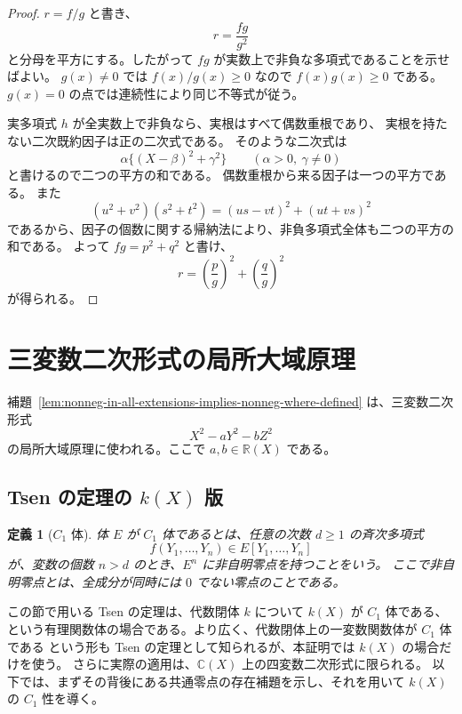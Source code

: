 \documentclass[uplatex,dvipdfmx]{jsarticle}
\newcommand{\Frac}{\mathbb{R}(X)}
\theoremstyle{matrixsosdefinition}
\newtheorem{definition}[theorem]{定義}
\begin{document}
\begin{proof}
  \(r=f/g\) と書き、
  \[
    r=\frac{fg}{g^2}
  \]
  と分母を平方にする。したがって \(fg\) が実数上で非負な多項式であることを示せばよい。
  \(g(x)\ne0\) では \(f(x)/g(x)\ge0\) なので \(f(x)g(x)\ge0\) である。
  \(g(x)=0\) の点では連続性により同じ不等式が従う。

  実多項式 \(h\) が全実数上で非負なら、実根はすべて偶数重根であり、
  実根を持たない二次既約因子は正の二次式である。
  そのような二次式は
  \[
    \alpha\{(X-\beta)^2+\gamma^2\}\qquad(\alpha>0,\ \gamma\ne0)
  \]
  と書けるので二つの平方の和である。
  偶数重根から来る因子は一つの平方である。
  また
  \[
    (u^2+v^2)(s^2+t^2)=(us-vt)^2+(ut+vs)^2
  \]
  であるから、因子の個数に関する帰納法により、非負多項式全体も二つの平方の和である。
  よって \(fg=p^2+q^2\) と書け、
  \[
    r=\left(\frac{p}{g}\right)^2+\left(\frac{q}{g}\right)^2
  \]
  が得られる。
\end{proof}

\section{三変数二次形式の局所大域原理}\label{sec:ternary-local-global}

補題~\ref{lem:nonneg-in-all-extensions-implies-nonneg-where-defined} は、三変数二次形式
\[
  X^2-aY^2-bZ^2
\]
の局所大域原理に使われる。ここで \(a,b\in\Frac\) である。

\subsection{\texorpdfstring{Tsen の定理の \(k(X)\) 版}{Tsen の定理の k(X) 版}}

\begin{definition}[\(C_1\) 体]
  体 \(E\) が \(C_1\) 体であるとは、任意の次数 \(d\ge1\) の斉次多項式
  \[
    f(Y_1,\ldots,Y_n)\in E[Y_1,\ldots,Y_n]
  \]
  が、変数の個数 \(n>d\) のとき、\(E^n\) に非自明零点を持つことをいう。
  ここで非自明零点とは、全成分が同時には \(0\) でない零点のことである。
\end{definition}

この節で用いる Tsen の定理は、代数閉体 \(k\) について \(k(X)\) が \(C_1\) 体である、
という有理関数体の場合である。より広く、代数閉体上の一変数関数体が \(C_1\) 体である
という形も Tsen の定理として知られるが、本証明では \(k(X)\) の場合だけを使う。
さらに実際の適用は、\(\mathbb{C}(X)\) 上の四変数二次形式に限られる。
以下では、まずその背後にある共通零点の存在補題を示し、それを用いて
\(k(X)\) の \(C_1\) 性を導く。
\end{document}
